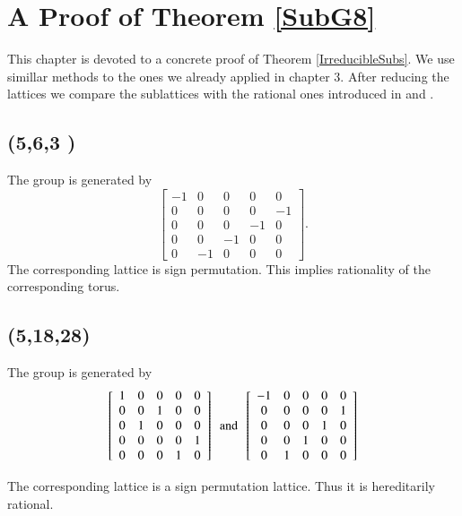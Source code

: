 \chapter{A Proof of Theorem \ref{SubG8}}\label{AppB}
This chapter is devoted to a concrete proof of Theorem \ref{IrreducibleSubs}. 
We use simillar methods to the ones we already applied in chapter 3. After 
reducing the lattices we compare the sublattices with the rational ones introduced 
in \cite{Kunyavski} and \cite{Nicole1}.
 \section{ (5,6,3 ) }
The group is generated by  
$$
\left[ \begin {array}{ccccc} -1&0&0&0&0\\0&0&0&0&-
1\\0&0&0&-1&0\\0&0&-1&0&0
\\0&-1&0&0&0\end {array} \right]. 
$$
The corresponding lattice is sign permutation. This implies rationality of 
the corresponding torus.
 \section{(5,18,28)}
The group is generated by 
$$
 \left[ \begin {array}{ccccc} 1&0&0&0&0\\0&0&1&0&0
\\0&1&0&0&0\\0&0&0&0&1
\\0&0&0&1&0\end {array} \right] 
\,\,\, \text{and} \,\,\,
 \left[ \begin {array}{ccccc} -1&0&0&0&0\\0&0&0&0&1
\\0&0&0&1&0\\0&0&1&0&0
\\0&1&0&0&0\end {array} \right] 
$$

The corresponding lattice is a sign permutation lattice. Thus it is hereditarily rational.

